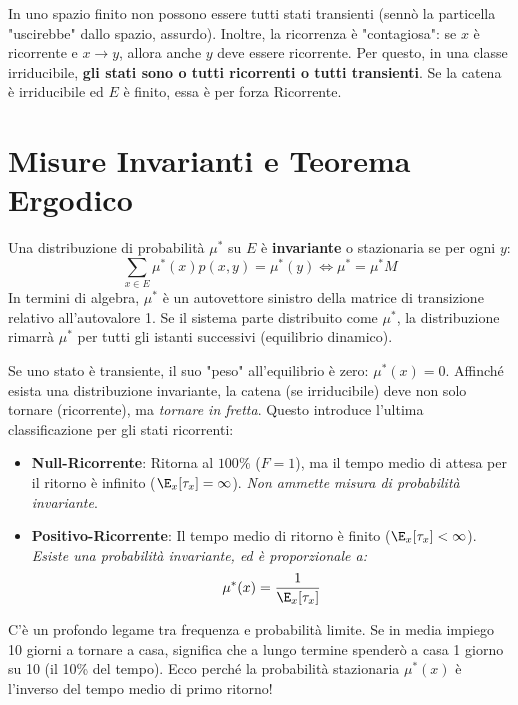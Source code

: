 \begin{hint}
In uno spazio finito non possono essere tutti stati transienti (sennò la particella "uscirebbe" dallo spazio, assurdo). 
Inoltre, la ricorrenza è "contagiosa": se $x$ è ricorrente e $x \to y$, allora anche $y$ deve essere ricorrente. Per questo, in una classe irriducibile, \textbf{gli stati sono o tutti ricorrenti o tutti transienti}. Se la catena è irriducibile ed $E$ è finito, essa è per forza Ricorrente.
\end{hint}

\section{Misure Invarianti e Teorema Ergodico}

\begin{definition}
Una distribuzione di probabilità $\mu^*$ su $E$ è \textbf{invariante} o stazionaria se per ogni $y$:
\[ \sum_{x \in E} \mu^*(x) p(x,y) = \mu^*(y) \iff \mu^* = \mu^* M \]
In termini di algebra, $\mu^*$ è un autovettore sinistro della matrice di transizione relativo all'autovalore 1. Se il sistema parte distribuito come $\mu^*$, la distribuzione rimarrà $\mu^*$ per tutti gli istanti successivi (equilibrio dinamico).
\end{definition}

Se uno stato è transiente, il suo "peso" all'equilibrio è zero: $\mu^*(x) = 0$.
Affinché esista una distribuzione invariante, la catena (se irriducibile) deve non solo tornare (ricorrente), ma \emph{tornare in fretta}. Questo introduce l'ultima classificazione per gli stati ricorrenti:

\begin{itemize}
    \item \textbf{Null-Ricorrente}: Ritorna al $100\%$ ($F=1$), ma il tempo medio di attesa per il ritorno è infinito ($\E_x[\tau_x] = \infty$). \emph{Non ammette misura di probabilità invariante}.
    \item \textbf{Positivo-Ricorrente}: Il tempo medio di ritorno è finito ($\E_x[\tau_x] < \infty$). \emph{Esiste una probabilità invariante, ed è proporzionale a:}
    \[ \mu^*(x) = \frac{1}{\E_x[\tau_x]} \]
\end{itemize}

\begin{spiegazione}
C'è un profondo legame tra frequenza e probabilità limite. Se in media impiego 10 giorni a tornare a casa, significa che a lungo termine spenderò a casa 1 giorno su 10 (il 10\% del tempo). Ecco perché la probabilità stazionaria $\mu^*(x)$ è l'inverso del tempo medio di primo ritorno!
\end{spiegazione}

